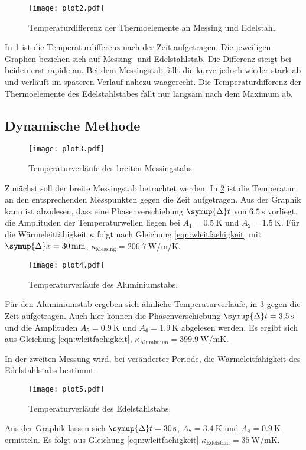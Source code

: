 \begin{figure}[H]
    \centering
    \texttt{[image: plot2.pdf]}
    \caption{Temperaturdifferenz der Thermoelemente an Messing und Edelstahl.}
    \label{fig:plot2}
\end{figure}


In \ref{fig:plot2} ist die Temperaturdifferenz nach der Zeit aufgetragen.
Die jeweiligen Graphen beziehen sich auf Messing- und Edelstahlstab.
Die Differenz steigt bei beiden erst rapide an.
Bei dem Messingstab fällt die kurve jedoch wieder stark ab und verläuft im späteren Verlauf nahezu waagerecht.
Die Temperaturdifferenz der Thermoelemente des Edelstahlstabes fällt nur langsam nach dem Maximum ab.


\subsection{Dynamische Methode}
\begin{figure}
    \centering
    \texttt{[image: plot3.pdf]}
    \caption{Temperaturverläufe des breiten Messingstabs.}
    \label{fig:plot3}
\end{figure}
Zunächst soll der breite Messingstab betrachtet werden.
In \ref{fig:plot3} ist die Temperatur an den entsprechenden Messpunkten gegen die Zeit aufgetragen. Aus der Graphik kann ist abzulesen, 
dass eine Phasenverschiebung $\symup{\Delta} t$ von $\SI{6.5}{\second}$ vorliegt. die Amplituden der Temperaturwellen liegen 
bei $A_1 = \SI{0.5}{\kelvin}$ und $A_2 = \SI{1.5}{\kelvin}$.
Für die Wärmeleitfähigkeit $\kappa$ folgt nach Gleichung \eqref{eqn:wleitfaehigkeit} mit $\symup{\Delta}x = \SI{30}{\milli\meter}$, 
$\kappa_\text{Messing} = \SI{206.7}{\watt\per\meter\per\kelvin}$.
\begin{figure}
    \centering
    \texttt{[image: plot4.pdf]}
    \caption{Temperaturverläufe des Aluminiumstabs.}
    \label{fig:plot4}
\end{figure}

Für den Aluminiumstab ergeben sich ähnliche Temperaturverläufe, in \ref{fig:plot4} gegen die Zeit aufgetragen. Auch hier können die 
Phasenverschiebung $\symup{\Delta} t = \SI{3.5}{\second}$ und die Amplituden $A_5 = 
\SI{0.9}{\kelvin}$ und $A_6 = \SI{1.9}{\kelvin}$ 
abgelesen werden. Es ergibt sich aus Gleichung \eqref{eqn:wleitfaehigkeit}, $\kappa_\text{Aluminium} = 
\SI{399.9}{\watt\per\meter\kelvin}$.

In der zweiten Messung wird, bei veränderter Periode, die Wärmeleitfähigkeit des Edelstahlstabs bestimmt.
\begin{figure}[H]
    \centering
    \texttt{[image: plot5.pdf]}
    \caption{Temperaturverläufe des Edelstahlstabs.}
    \label{fig:plot5}
\end{figure}
Aus der Graphik lassen sich $\symup{\Delta} t = \SI{30}{\second}$, $A_7 = \SI{3.4}{\kelvin}$ 
und $A_8 = \SI{0.9}{\kelvin}$ ermitteln.
Es folgt aus Gleichung \eqref{eqn:wleitfaehigkeit} $\kappa_\text{Edelstahl} = 
\SI{35}{\watt\per\meter\kelvin}$.

